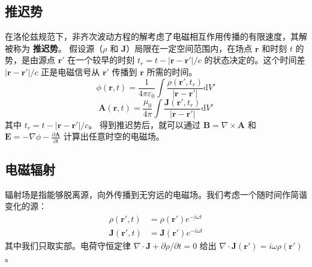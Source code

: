 \documentclass[fontset=none]{ctexart}
\begin{document}
\subsection{推迟势}
在洛伦兹规范下，非齐次波动方程的解考虑了电磁相互作用传播的有限速度，其解被称为 \textbf{推迟势}。
假设源（$\rho$ 和 $\bm{J}$）局限在一定空间范围内，在场点 $\bm{r}$ 和时刻 $t$ 的势，是由源点 $\bm{r}'$ 在一个较早的时刻 $t_r = t - |\bm{r}-\bm{r}'|/c$ 的状态决定的。这个时间差 $|\bm{r}-\bm{r}'|/c$ 正是电磁信号从 $\bm{r}'$ 传播到 $\bm{r}$ 所需的时间。
\begin{equation}
    \phi(\bm{r}, t) = \frac{1}{4\pi\varepsilon_0} \int \frac{\rho(\bm{r}', t_r)}{|\bm{r}-\bm{r}'|} \mathrm{d}V'
\end{equation}
\begin{equation}
    \bm{A}(\bm{r}, t) = \frac{\mu_0}{4\pi} \int \frac{\bm{J}(\bm{r}', t_r)}{|\bm{r}-\bm{r}'|} \mathrm{d}V'
\end{equation}
其中 $t_r = t - |\bm{r}-\bm{r}'|/c$。
得到推迟势后，就可以通过 $\bm{B} = \nabla \times \bm{A}$ 和 $\bm{E} = -\nabla \phi - \frac{\partial \bm{A}}{\partial t}$ 计算出任意时空的电磁场。

\subsection{电磁辐射}
辐射场是指能够脱离源，向外传播到无穷远的电磁场。我们考虑一个随时间作简谐变化的源：
\begin{equation}
    \begin{aligned}
        \rho(\bm{r}', t) &= \rho(\bm{r}') e^{-i\omega t} \\
        \bm{J}(\bm{r}', t) &= \bm{J}(\bm{r}') e^{-i\omega t}
    \end{aligned}
\end{equation}
其中我们只取实部。电荷守恒定律 $\nabla \cdot \bm{J} + \partial\rho/\partial t = 0$ 给出 $\nabla \cdot \bm{J}(\bm{r}') = i\omega \rho(\bm{r}')$。
\end{document}
